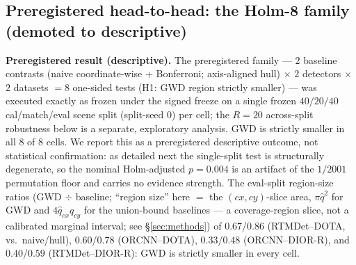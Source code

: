 \documentclass[11pt]{article}
\begin{document}
\subsection{Preregistered head-to-head: the Holm-8 family (demoted to descriptive)}\label{sec:holm8}
\textbf{Preregistered result (descriptive).} The preregistered family --- $2$ baseline contrasts (naive
coordinate-wise + Bonferroni; axis-aligned hull) $\times$ $2$ detectors $\times$ $2$ datasets $= 8$
one-sided tests (H1: GWD region strictly smaller) --- was executed exactly as frozen under the signed freeze
on a single frozen $40/20/40$ cal/match/eval scene split
(split-seed $0$) per cell; the $R{=}20$ across-split robustness below is a separate, exploratory
analysis. GWD is strictly smaller in all $8$ of $8$ cells. We report this as a preregistered
descriptive outcome, not statistical confirmation: as detailed next the single-split test is
structurally degenerate, so the nominal Holm-adjusted $p=0.004$ is an artifact of the $1/2001$ permutation
floor and carries no evidence strength. The eval-split region-size ratios (GWD $\div$ baseline; ``region size'' here $=$ the
$(cx,cy)$-slice area, $\pi\hat q^2$ for GWD and $4\hat q_{cx}\hat q_{cy}$ for the union-bound baselines
--- a coverage-region slice, not a calibrated marginal interval; see \S\ref{sec:methods}) of
$0.67$/$0.86$ (RTMDet--DOTA, vs.\ naive/hull), $0.60$/$0.78$ (ORCNN--DOTA), $0.33$/$0.48$
(ORCNN--DIOR-R), and $0.40$/$0.59$ (RTMDet--DIOR-R): GWD is strictly smaller in every cell.
\end{document}
